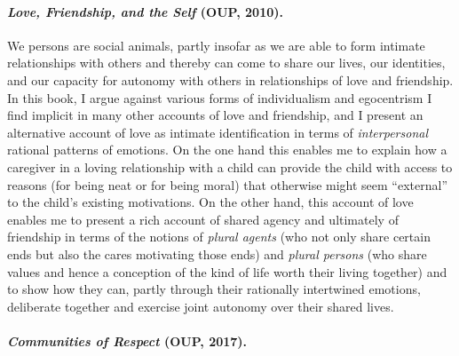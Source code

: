\documentclass[%
  11pt,%
]{article}
\begin{document}

\paragraph{\emph{Love, Friendship, and the Self} (OUP, 2010).}

We persons are social animals, partly insofar as we are able to form intimate relationships with others and thereby can come to share our lives, our identities, and our capacity for autonomy with others in relationships of love and friendship. In this book, I argue against various forms of individualism and egocentrism I find implicit in many other accounts of love and friendship, and I present an alternative account of love as intimate identification in terms of \emph{interpersonal} rational patterns of emotions. On the one hand this enables me to explain how a caregiver in a loving relationship with a child can provide the child with access to reasons (for being neat or for being moral) that otherwise might seem \enquote{external} to the child's existing motivations. On the other hand, this account of love enables me to present a rich account of shared agency and ultimately of friendship in terms of the notions of \emph{plural agents} (who not only share certain ends but also the cares motivating those ends) and \emph{plural persons} (who share values and hence a conception of the kind of life worth their living together) and to show how they can, partly through their rationally intertwined emotions, deliberate together and exercise joint autonomy over their shared lives.

\paragraph{\emph{Communities of Respect} (OUP, 2017).}
\end{document}
